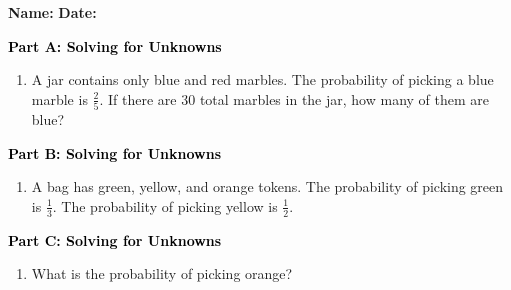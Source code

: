 \documentclass[12pt, letterpaper, fleqn]{article}
\newcommand{\blank}{\underline{\hspace{2.2cm}}}
\begin{document}
\textbf{Name:} \underline{\hspace{5cm}}
\hfill
\textbf{Date:} \underline{\hspace{3cm}}\\

\begin{tcolorbox}[colback=customteal!20]
\large\textcolor{black}{\textbf{Part A: Solving for Unknowns}}
\end{tcolorbox}

\vspace{3mm}

\begin{enumerate}[itemsep=5.5cm, leftmargin=0.6cm]
\item A jar contains only blue and red marbles. The probability of picking a blue marble is $\frac{2}{5}$. If there are $30$ total marbles in the jar, how many of them are blue?
\end{enumerate}

\newpage

\begin{tcolorbox}[colback=customteal!20]
\large\textcolor{black}{\textbf{Part B: Solving for Unknowns}}
\end{tcolorbox}

\vspace{3mm}

\begin{enumerate}[itemsep=5.5cm, leftmargin=0.6cm, resume]
\item A bag has green, yellow, and orange tokens. The probability of picking green is $\frac{1}{3}$. The probability of picking yellow is $\frac{1}{2}$. 
\end{enumerate}

\newpage

\begin{tcolorbox}[colback=customteal!20]
\large\textcolor{black}{\textbf{Part C: Solving for Unknowns}}
\end{tcolorbox}

\vspace{3mm}

\begin{enumerate}[itemsep=5.5cm, leftmargin=0.6cm, resume]
\item What is the probability of picking orange? \blank
\end{enumerate}
\end{document}
